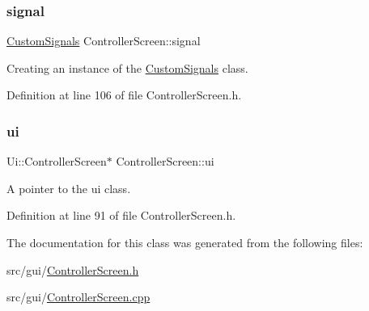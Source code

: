 \subsubsection{\texorpdfstring{signal}{signal}}
{\footnotesize\ttfamily \hyperlink{struct_custom_signals}{Custom\+Signals} Controller\+Screen\+::signal\hspace{0.3cm}{\ttfamily [private]}}



Creating an instance of the \hyperlink{struct_custom_signals}{Custom\+Signals} class. 



Definition at line 106 of file Controller\+Screen.\+h.

\mbox{\label{class_controller_screen_a25a37166616a171730a89ddb69c120f3}} 
\subsubsection{\texorpdfstring{ui}{ui}}
{\footnotesize\ttfamily Ui\+::\+Controller\+Screen$\ast$ Controller\+Screen\+::ui\hspace{0.3cm}{\ttfamily [private]}}



A pointer to the ui class. 



Definition at line 91 of file Controller\+Screen.\+h.



The documentation for this class was generated from the following files\+:\begin{DoxyCompactItemize}
\item 
src/gui/\hyperlink{_controller_screen_8h}{Controller\+Screen.\+h}\item 
src/gui/\hyperlink{_controller_screen_8cpp}{Controller\+Screen.\+cpp}\end{DoxyCompactItemize}
